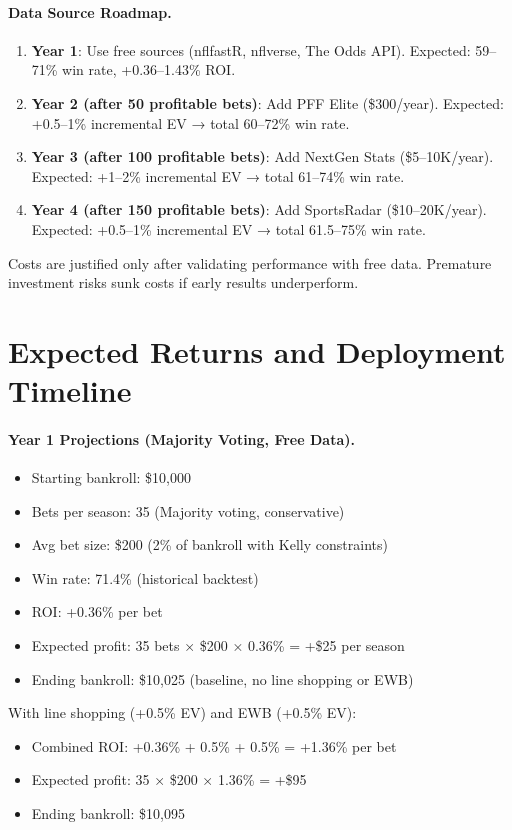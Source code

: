 \paragraph{Data Source Roadmap.}
\begin{enumerate}
\item \textbf{Year 1}: Use free sources (nflfastR, nflverse, The Odds API). Expected: 59--71\% win rate, +0.36--1.43\% ROI.
\item \textbf{Year 2 (after 50 profitable bets)}: Add PFF Elite (\$300/year). Expected: +0.5--1\% incremental EV → total 60--72\% win rate.
\item \textbf{Year 3 (after 100 profitable bets)}: Add NextGen Stats (\$5--10K/year). Expected: +1--2\% incremental EV → total 61--74\% win rate.
\item \textbf{Year 4 (after 150 profitable bets)}: Add SportsRadar (\$10--20K/year). Expected: +0.5--1\% incremental EV → total 61.5--75\% win rate.
\end{enumerate}

Costs are justified only after validating performance with free data. Premature investment risks sunk costs if early results underperform.

\section{Expected Returns and Deployment Timeline}
\label{sec:expected_returns}

\paragraph{Year 1 Projections (Majority Voting, Free Data).}
\begin{itemize}
\item Starting bankroll: \$10,000
\item Bets per season: 35 (Majority voting, conservative)
\item Avg bet size: \$200 (2\% of bankroll with Kelly constraints)
\item Win rate: 71.4\% (historical backtest)
\item ROI: +0.36\% per bet
\item Expected profit: 35 bets × \$200 × 0.36\% = +\$25 per season
\item Ending bankroll: \$10,025 (baseline, no line shopping or EWB)
\end{itemize}

With line shopping (+0.5\% EV) and EWB (+0.5\% EV):
\begin{itemize}
\item Combined ROI: +0.36\% + 0.5\% + 0.5\% = +1.36\% per bet
\item Expected profit: 35 × \$200 × 1.36\% = +\$95
\item Ending bankroll: \$10,095
\end{itemize}

